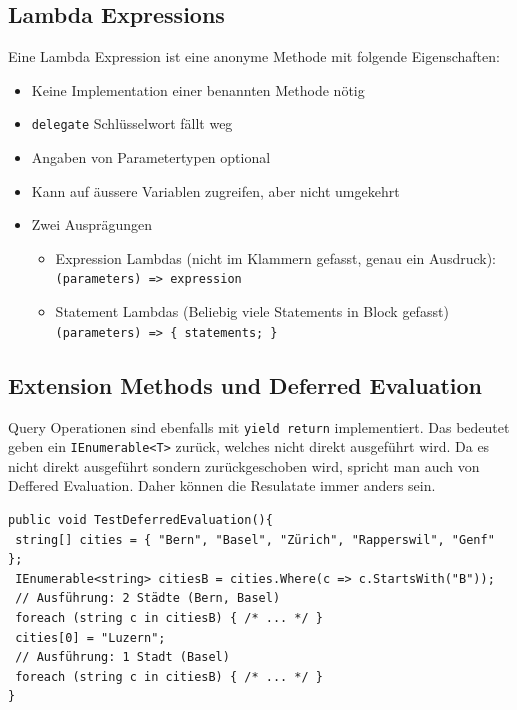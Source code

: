 \documentclass[
a4paper,
oneside,
10pt,
fleqn,
headsepline,
toc=listofnumbered, 
bibliography=totocnumbered]{scrartcl}
\begin{document}
\subsection{Lambda Expressions}
Eine Lambda Expression ist eine anonyme Methode mit folgende Eigenschaften:
\begin{itemize}
	\item Keine Implementation einer benannten Methode nötig
	\item \lstinline|delegate| Schlüsselwort fällt weg
	\item Angaben von Parametertypen optional
	\item Kann auf äussere Variablen zugreifen, aber nicht umgekehrt
	\item Zwei Ausprägungen
	      \begin{itemize}
		      \item Expression Lambdas (nicht im Klammern gefasst, genau ein Ausdruck): \lstinline|(parameters) => expression|
		      \item Statement Lambdas (Beliebig viele Statements in Block gefasst) \lstinline|(parameters) => { statements; }|
	      \end{itemize}
\end{itemize}

\subsection{Extension Methods und Deferred Evaluation}
Query Operationen sind ebenfalls mit \lstinline|yield return| implementiert. Das bedeutet geben ein \lstinline|IEnumerable<T>| zurück, welches nicht direkt ausgeführt wird. Da es nicht direkt ausgeführt sondern zurückgeschoben wird, spricht man auch von Deffered Evaluation. Daher können die Resulatate immer anders sein.

\begin{lstlisting}
public void TestDeferredEvaluation(){
 string[] cities = { "Bern", "Basel", "Zürich", "Rapperswil", "Genf" };
 IEnumerable<string> citiesB = cities.Where(c => c.StartsWith("B"));
 // Ausführung: 2 Städte (Bern, Basel)
 foreach (string c in citiesB) { /* ... */ } 
 cities[0] = "Luzern"; 
 // Ausführung: 1 Stadt (Basel)
 foreach (string c in citiesB) { /* ... */ }
} 
\end{lstlisting}
\end{document}
